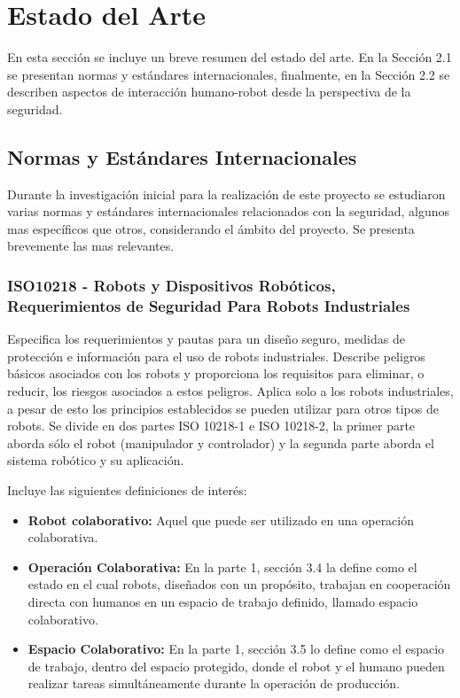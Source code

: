 \documentclass[withindex,glossary]{cam-thesis}
\begin{document}
\chapter{Estado del Arte}
En esta sección se incluye un breve resumen del estado del arte. En la Sección 2.1 se presentan normas y estándares internacionales, finalmente, en la Sección 2.2 se describen aspectos de interacción humano-robot desde la perspectiva de la seguridad.

\section{Normas y Estándares Internacionales}
Durante la investigación inicial para la realización de este proyecto se estudiaron varias normas y estándares internacionales relacionados con la seguridad, algunos mas específicos que otros, considerando el ámbito del proyecto. Se presenta brevemente las mas relevantes.

\subsection{ISO10218 - Robots y Dispositivos Robóticos, Requerimientos de Seguridad Para Robots Industriales} \label{sec: Marco Teorico :: Normas :: ISO 10218}
Especifica los requerimientos y pautas para un diseño seguro, medidas de protección e información para el uso de robots industriales. Describe peligros básicos asociados con los robots y proporciona los requisitos para eliminar, o reducir, los riesgos asociados a estos peligros. Aplica solo a los robots industriales, a pesar de esto los principios establecidos se pueden utilizar para otros tipos de robots. Se divide en dos partes ISO 10218-1 e ISO 10218-2, la primer parte aborda sólo el robot (manipulador y controlador) y la segunda parte aborda el sistema robótico y su aplicación.

Incluye las siguientes definiciones de interés:
\begin{itemize}[topsep=-11pt]
	\item \textbf{Robot colaborativo:} Aquel que puede ser utilizado en una operación colaborativa.
    \item \textbf{Operación Colaborativa:} En la parte 1, sección 3.4 la define como el estado en el cual robots, diseñados con un propósito, trabajan en cooperación directa con humanos en un espacio de trabajo definido, llamado espacio colaborativo.
    \item \textbf{Espacio Colaborativo:} En la parte 1, sección 3.5 lo define como el espacio de trabajo, dentro del espacio protegido, donde el robot y el humano pueden realizar tareas simultáneamente durante la operación de producción.
\\[-7pt]
\end{itemize}
\end{document}
